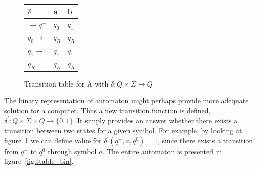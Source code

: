 \documentclass{mini}
\begin{document}
%
%
\begin{figure}[H]
    \CenterFloatBoxes
    \begin{floatrow}
        
        \ttabbox
        {
            \centering
            \setlength{\tabcolsep}{15pt}
            \renewcommand{\arraystretch}{1.5}
            \begin{tabular}{|P{1.0cm} || P{0.6cm} | P{0.6cm} |}
                \hline
                $\delta$ & a & b \\
                \hline
                \hline
                $\rightarrow q^-$ 		& $q_0$ & $q_1$ \\
                \hline
                $q_0 \rightarrow$ 		& $q_R$ & $q_R$ \\
                \hline
                $q_1 \rightarrow$ 		& $q_1$ & $q_1$ \\
                \hline
                $q_R$  					& $q_R$ & $q_R$ \\
                \hline
            \end{tabular}
        }
        {\caption{Transition table for A with $\delta: Q \times \Sigma \rightarrow Q$}\label{fig:ttable_std}}
        
        
    \end{floatrow}
\end{figure}


The binary representation of automaton might perhaps provide more adequate solution for a computer. Thus a new transition function is defined, $\delta^{'}: Q \times \Sigma \times Q \rightarrow \{0,1\}$. It simply provides an answer whether there exists a transition between two states for a given symbol. For example, by looking at figure~\ref{fig:ttable_std} we can define value for $\delta^{'}(q^-,a,q^0) = 1$, since there exists a transition from $q^-$ to $q^0$ through symbol $a$. The entire automaton is presented in figure~\ref{fig:ttable_bin}.
\end{document}
